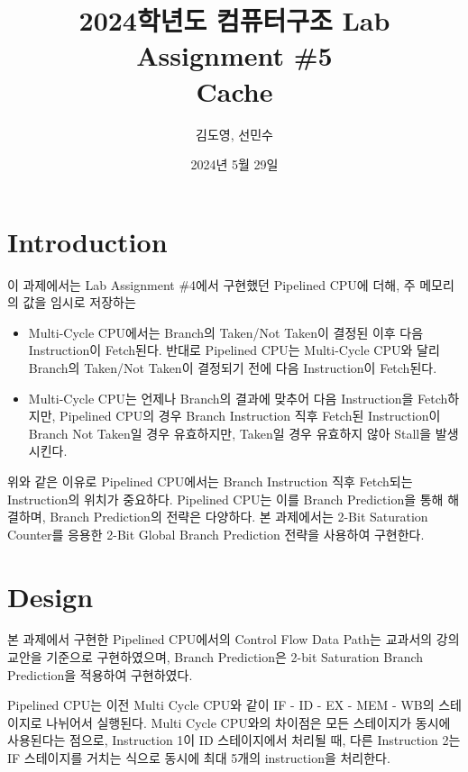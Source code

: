 \documentclass[openright, a4paper]{article}
\title{2024학년도 컴퓨터구조 Lab Assignment \#5\\
        Cache}
\author{김도영, 선민수}
\date{2024년 5월 29일}
\begin{document}
\maketitle


\section{Introduction}
이 과제에서는 Lab Assignment \#4에서 구현했던 Pipelined CPU에 더해, 주 메모리의
값을 임시로 저장하는 

\begin{itemize}
    \item Multi-Cycle CPU에서는 Branch의 Taken/Not Taken이 결정된 이후 다음 Instruction이 Fetch된다. 반대로 Pipelined CPU는 Multi-Cycle CPU와 달리 Branch의 Taken/Not Taken이 결정되기 전에 다음 Instruction이 Fetch된다.
    \item Multi-Cycle CPU는 언제나 Branch의 결과에 맞추어 다음 Instruction을 Fetch하지만, Pipelined CPU의 경우 Branch Instruction 직후 Fetch된 Instruction이 Branch Not Taken일 경우 유효하지만, Taken일 경우 유효하지 않아 Stall을 발생시킨다.
\end{itemize}

위와 같은 이유로 Pipelined CPU에서는 Branch Instruction 직후 Fetch되는 Instruction의 위치가 중요하다. Pipelined CPU는 이를 Branch Prediction을 통해 해결하며, Branch Prediction의 전략은 다양하다. 본 과제에서는 2-Bit Saturation Counter를 응용한 2-Bit Global Branch Prediction 전략을 사용하여 구현한다.


\section{Design}
본 과제에서 구현한 Pipelined CPU에서의 Control Flow Data Path는 교과서의 강의 교안을 기준으로 구현하였으며, Branch Prediction은 2-bit Saturation Branch Prediction을 적용하여 구현하였다.

\hfill

Pipelined CPU는 이전 Multi Cycle CPU와 같이 IF - ID - EX - MEM - WB의 스테이지로 나뉘어서 실행된다. Multi Cycle CPU와의 차이점은 모든 스테이지가 동시에 사용된다는 점으로, Instruction 1이 ID 스테이지에서 처리될 때, 다른 Instruction 2는 IF 스테이지를 거치는 식으로 동시에 최대 5개의 instruction을 처리한다.
\end{document}
